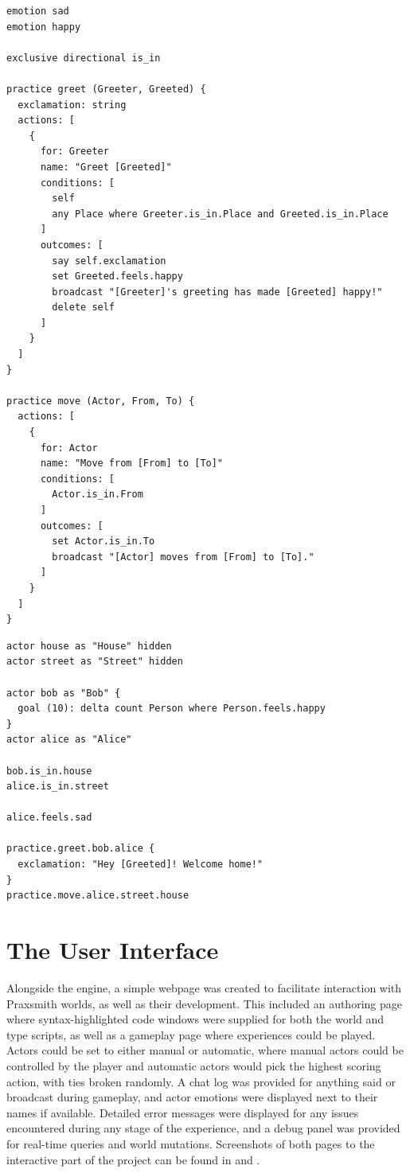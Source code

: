 \begin{lstlisting}[float=hb, caption=Type definitions for the simple example., label=lst:SimpleExampleTypes]
emotion sad
emotion happy

exclusive directional is_in

practice greet (Greeter, Greeted) {
  exclamation: string
  actions: [
    {
      for: Greeter
      name: "Greet [Greeted]"
      conditions: [
        self
        any Place where Greeter.is_in.Place and Greeted.is_in.Place
      ]
      outcomes: [
        say self.exclamation
        set Greeted.feels.happy
        broadcast "[Greeter]'s greeting has made [Greeted] happy!"
        delete self
      ]
    }
  ]
}

practice move (Actor, From, To) {
  actions: [
    {
      for: Actor
      name: "Move from [From] to [To]"
      conditions: [
        Actor.is_in.From
      ]
      outcomes: [
        set Actor.is_in.To
        broadcast "[Actor] moves from [From] to [To]."
      ]
    }
  ]
}
\end{lstlisting}

\begin{lstlisting}[float=hb, caption=World initialization for the simple example., label=lst:SimpleExampleWorld]
actor house as "House" hidden
actor street as "Street" hidden

actor bob as "Bob" {
  goal (10): delta count Person where Person.feels.happy
}
actor alice as "Alice"

bob.is_in.house
alice.is_in.street

alice.feels.sad

practice.greet.bob.alice {
  exclamation: "Hey [Greeted]! Welcome home!"
}
practice.move.alice.street.house
\end{lstlisting}

\section{The User Interface} \label{sec:TheUserInterface}

Alongside the engine, a simple webpage was created to facilitate interaction with
Praxsmith worlds, as well as their development. This included an authoring page where
syntax-highlighted code windows were supplied for both the world and type scripts,
as well as a gameplay page where experiences could be played. Actors could be set
to either manual or automatic, where manual actors could be controlled by the player
and automatic actors would pick the highest scoring action, with ties broken randomly.
A chat log was provided for anything said or broadcast during gameplay, and actor
emotions were displayed next to their names if available. Detailed error messages were
displayed for any issues encountered during any stage of the experience, and a debug
panel was provided for real-time queries and world mutations. Screenshots of both pages
to the interactive part of the project can be found in  and .

